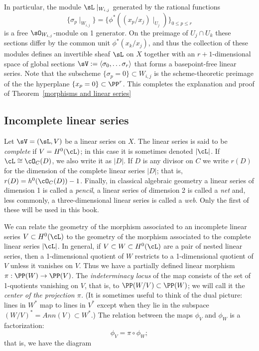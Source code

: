 In particular, the module $\sL\mid_{W_{i,j}}$ generated by the rational functions 
$$
\{\sigma_p\mid_{W_{i,j}}\}= 
\{\phi^*((x_p/x_j)\mid_{U_j})\}
_{0\leq p\leq r}
$$
 is a free $\sO_{W_{i,j}}$-module on 1 generator. On the preimage of $U_j\cap U_k$ these sections differ by the common unit $\phi^*(x_k/x_j)$, and thus the collection of these modules defines an invertible sheaf $\sL$ on $X$ together with an
$r+1$-dimensional space of global sections $\sV := \langle \sigma_0,\dots \sigma_r\rangle$ that forms a basepoint-free linear series. Note that the subscheme  $\{\sigma_p = 0\} \subset W_{i,j}$  is the scheme-theoretic preimage of the
the hyperplane $\{x_p = 0\}\subset \PP^r$. This completes the explanation and proof of Theorem~\ref{morphisms and linear series}


\subsection{Incomplete linear series}


Let $\sV = (\sL, V)$ be a linear series on $X$.  The linear series is said to be \emph{complete} if $V = H^0(\cL)$; in this case it is sometimes denoted $|\cL|$. If $\cL \cong \cO_C(D)$, we also write it as $|D|$. 
 If $D$ is any divisor on $C$ we write $r(D)$ for the dimension of the complete linear series $|D|$; that is, $r(D) = h^0(\cO_C(D)) - 1$. Finally, in classical algebraic geometry a linear series of dimension 1 is called a \emph{pencil}, a linear series of dimension 2 is called a \emph{net} and, less commonly, a three-dimensional linear series is called a \emph{web}.  Only the first of these will be
 used in this book.

We can relate the geometry of the morphism associated to an incomplete linear series $V \subset H^0(\cL)$ to the geometry of the morphism associated to the complete linear series $|\cL|$. In general, if $V \subset W \subset H^0(\cL)$ are a pair of nested linear series, then a 1-dimensional quotient of $W$ restricts to a 1-dimensional quotient of $V$ unless it vanishes on $V$.
Thus we have a partially defined linear morphism $\pi: \PP(W)  \to \PP(V)$. The \emph{indeterminacy locus} of the map
consists of the set of 1-quotients vanishing on $V$, that is, to $\PP(W/V) \subset \PP(W)$; we will call it the 
\emph{center of the projection $\pi$.} (It is sometimes useful to
think of the dual picture: lines in $W^*$ map to lines in $V^*$ except when they lie in the subspace $(W/V)^* = Ann(V)\subset W^*$.)
The relation between the maps $\phi_V$ and $\phi_W$ is a factorization:
$$
\phi_V = \pi \circ \phi_W;
$$
that is, we have the diagram 

